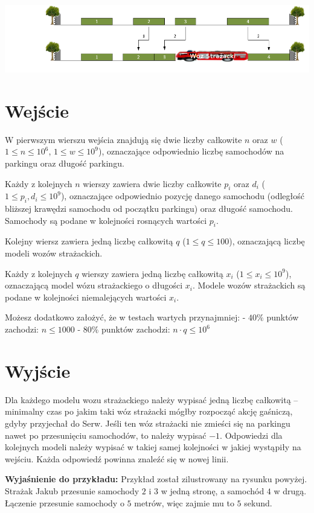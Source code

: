\documentclass[zad,zawodnik,utf8]{sinol}
\begin{document}
\begin{tasktext}
\medskip
\noindent
\includegraphics[width=15cm]{rysunek}

  \section{Wejście}
W pierwszym wierszu wejścia znajdują się dwie liczby całkowite $n$ oraz $w$ ($1 \leq n \leq 10^6$, $1 \leq w \leq 10^9$), oznaczające odpowiednio liczbę samochodów na parkingu oraz długość parkingu.

Każdy z kolejnych $n$ wierszy zawiera dwie liczby całkowite $p_i$ oraz $d_i$ ($1 \leq p_i, d_i \leq 10^9$), oznaczające odpowiednio pozycję danego samochodu (odległość bliższej krawędzi samochodu od początku parkingu) oraz długość samochodu. Samochody są podane w kolejności rosnących wartości $p_i$.

Kolejny wiersz zawiera jedną liczbę całkowitą $q$ ($1 \leq q \leq 100$), oznaczającą liczbę modeli wozów strażackich.

Każdy z kolejnych $q$ wierszy zawiera jedną liczbę całkowitą $x_i$ ($1 \leq x_i \leq 10^9$), oznaczającą model wózu strażackiego o długości $x_i$. Modele wozów strażackich są podane w kolejności niemalejących wartości $x_i$.

Możesz dodatkowo założyć, że w testach wartych przynajmniej:\newline
- $40\%$ punktów zachodzi: $n \leq 1000$\newline
- $80\%$ punktów zachodzi: $n \cdot q \leq 10^6$\newline


  \section{Wyjście}
Dla każdego modelu wozu strażackiego należy wypisać jedną liczbę całkowitą -- minimalny czas po jakim taki wóz strażacki mógłby rozpocząć akcję gaśniczą, gdyby przyjechał do Serw. Jeśli ten wóz strażacki nie zmieści się na parkingu nawet po przesunięciu samochodów, to należy wypisać $-1$. Odpowiedzi dla kolejnych modeli należy wypisać w takiej samej kolejności w jakiej wystąpiły na wejściu. Każda odpowiedź powinna znaleźć się w nowej linii.

\makecompactexample

\medskip
\noindent
\textbf{Wyjaśnienie do przykładu:}
Przykład został zilustrowany na rysunku powyżej. Strażak Jakub przesunie samochody $2$ i $3$ w jedną stronę, a samochód $4$ w drugą. Łączenie przesunie samochody o $5$ metrów, więc zajmie mu to $5$ sekund.

\end{tasktext}
\end{document}

